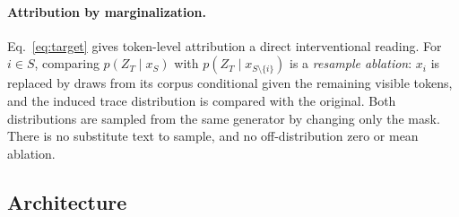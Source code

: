 \documentclass[11pt]{article}
\begin{document}
\paragraph{Attribution by marginalization.} Eq.~\eqref{eq:target} gives token-level attribution a direct
interventional reading. For $i \in S$, comparing $p(Z_T\mid x_S)$ with $p(Z_T\mid x_{S\setminus\{i\}})$ is a
\emph{resample ablation}: $x_i$ is replaced by draws from its corpus conditional given the remaining visible tokens, and
the induced trace distribution is compared with the original. Both distributions are sampled from the same generator by
changing only the mask. There is no substitute text to sample, and no off-distribution zero or mean ablation.

\subsection{Architecture}
\end{document}
